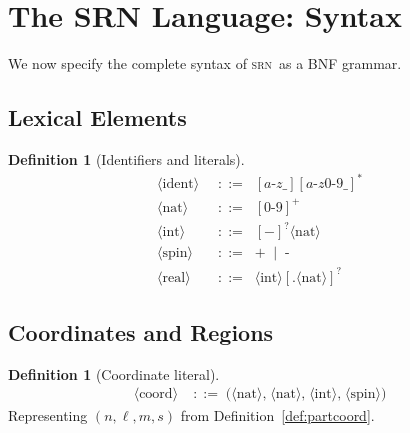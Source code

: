 \documentclass[twocolumn,11pt,a4paper]{article}
\theoremstyle{definition}
\newtheorem{definition}[theorem]{Definition}
\theoremstyle{remark}
\newcommand{\srn}{\textsc{srn}}
\newcommand{\bnfeq}{\;{::=}\;}
\newcommand{\bnfor}{\;\mid\;}
\begin{document}
\section{The SRN Language: Syntax}
\label{sec:syntax}

We now specify the complete syntax of \srn\ as a BNF grammar.

\subsection{Lexical Elements}

\begin{definition}[Identifiers and literals]
\begin{align*}
\langle\text{ident}\rangle \;&\bnfeq\; [a\text{-}z\_][a\text{-}z0\text{-}9\_]^*\\
\langle\text{nat}\rangle   \;&\bnfeq\; [0\text{-}9]^+\\
\langle\text{int}\rangle   \;&\bnfeq\; [-]^?\langle\text{nat}\rangle\\
\langle\text{spin}\rangle  \;&\bnfeq\; \texttt{+} \bnfor \texttt{-}\\
\langle\text{real}\rangle  \;&\bnfeq\; \langle\text{int}\rangle[\texttt{.}\langle\text{nat}\rangle]^?
\end{align*}
\end{definition}

\subsection{Coordinates and Regions}

\begin{definition}[Coordinate literal]
\begin{align*}
\langle\text{coord}\rangle &\bnfeq
  \texttt{(}\langle\text{nat}\rangle\texttt{,}\;
           \langle\text{nat}\rangle\texttt{,}\;
           \langle\text{int}\rangle\texttt{,}\;
           \langle\text{spin}\rangle\texttt{)}
\end{align*}
Representing $(n, \ell, m, s)$ from Definition~\ref{def:partcoord}.
\end{definition}
\end{document}
